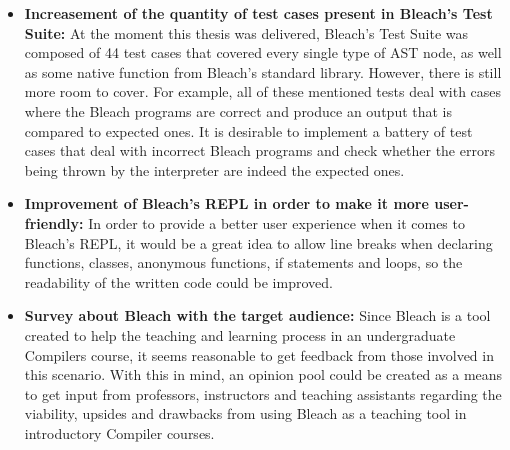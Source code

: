 \begin{itemize}
    \item \textbf{Increasement of the quantity of test cases present in Bleach's Test Suite:} At the moment this thesis was delivered, Bleach's Test Suite was composed of 44 test cases that covered every single type of AST node, as well as some native function from Bleach's standard library. However, there is still more room to cover. For example, all of these mentioned tests deal with cases where the Bleach programs are correct and produce an output that is compared to expected ones. It is desirable to implement a battery of test cases that deal with incorrect Bleach programs and check whether the errors being thrown by the interpreter are indeed the expected ones.

    \item \textbf{Improvement of Bleach's REPL in order to make it more user-friendly:} In order to provide a better user experience when it comes to Bleach's REPL, it would be a great idea to allow line breaks when declaring functions, classes, anonymous functions, if statements and loops, so the readability of the written code could be improved.

    \item \textbf{Survey about Bleach with the target audience:} Since Bleach is a tool created to help the teaching and learning process in an undergraduate Compilers course, it seems reasonable to get feedback from those involved in this scenario. With this in mind, an opinion pool could be created as a means to get input from professors, instructors and teaching assistants regarding the viability, upsides and drawbacks from using Bleach as a teaching tool in introductory Compiler courses.
\end{itemize}


